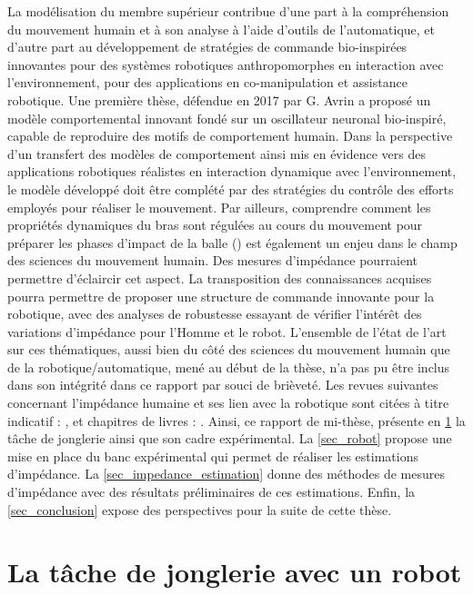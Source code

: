 \documentclass[12pt, a4paper]{article} %
\numberwithin{equation}{section}
\begin{document}
La modélisation du membre supérieur contribue d’une part à la compréhension du mouvement humain et à son analyse à l’aide d’outils de l’automatique, et d’autre part au développement de stratégies de commande bio-inspirées innovantes pour des systèmes robotiques anthropomorphes en interaction avec l’environnement, pour des applications en co-manipulation et assistance robotique. Une première thèse, défendue en 2017 par G. Avrin a proposé un modèle comportemental innovant fondé sur un oscillateur neuronal bio-inspiré, capable de reproduire des motifs de comportement humain.
%
\newlineBlank
%
Dans la perspective d’un transfert des modèles de comportement ainsi mis en évidence vers des applications robotiques réalistes en interaction dynamique avec l’environnement, le modèle développé doit être complété par des stratégies du contrôle des efforts employés pour réaliser le mouvement. Par ailleurs, comprendre comment les propriétés dynamiques du bras sont régulées au cours du mouvement pour préparer les phases d’impact de la balle (\cite{tsuji_bio-mimetic_2008}) est également un enjeu dans le champ des sciences du mouvement humain. Des mesures d'impédance pourraient permettre d'éclaircir cet aspect. La transposition des connaissances acquises pourra permettre de proposer une structure de commande innovante pour la robotique, avec des analyses de robustesse essayant de vérifier l'intérêt des variations d'impédance pour l'Homme et le robot. 
%
\newlineBlank
%
L'ensemble de l'état de l'art sur ces thématiques, aussi bien du côté des sciences du mouvement humain que de la robotique/automatique, mené au début de la thèse, n'a pas pu être inclus dans son intégrité dans ce rapport par souci de brièveté. Les revues suivantes concernant l'impédance humaine et ses lien avec la robotique sont citées à titre indicatif : \cite{mizrahi_mechanical_2015,vanderborght_variable_2013,nikooyan_mass-spring-damper_2011}, et chapitres de livres : \cite{burdet_interaction_2014,tsuji_human_1997}.
%
\newlineBlank
%
Ainsi, ce rapport de mi-thèse, présente en \cref{sec_bouncing} la tâche de jonglerie ainsi que son cadre expérimental. La \cref{sec_robot} propose une mise en place du banc expérimental qui permet de réaliser les estimations d'impédance. La \cref{sec_impedance_estimation} donne des méthodes de mesures d'impédance avec des résultats préliminaires de ces estimations. Enfin, la \cref{sec_conclusion} expose des perspectives pour la suite de cette thèse.

\section{La tâche de jonglerie avec un robot}  \label{sec_bouncing}
\end{document}
